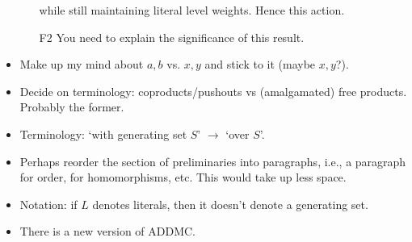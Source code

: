 \documentclass{article}
\theoremstyle{definition}
\theoremstyle{remark}
\begin{document}
\begin{itemize}
\begin{itemize}
    while still maintaining literal level weights. Hence this action.
  \item[F2] You need to explain the significance of this result.
  \end{itemize}
\item Make up my mind about $a, b$ vs. $x, y$ and stick to it (maybe $x, y$?).
\item Decide on terminology: coproducts/pushouts vs (amalgamated) free products.
  Probably the former.
\item Terminology: `with generating set $S$' $\to$ `over $S$'.
\item Perhaps reorder the section of preliminaries into paragraphs, i.e., a
  paragraph for order, for homomorphisms, etc. This would take up less space.
\item Notation: if $L$ denotes literals, then it doesn't denote a generating
  set.
\item There is a new version of ADDMC.
\end{itemize}
\end{document}

